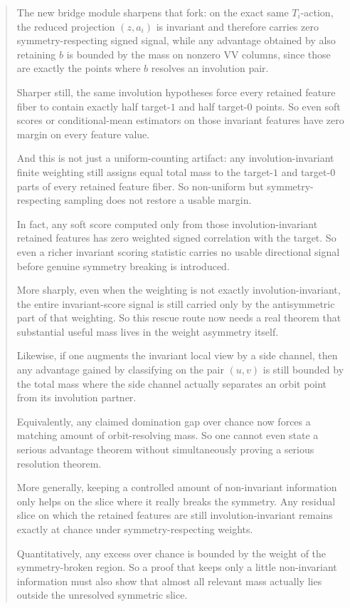 \documentclass[11pt]{article}
\theoremstyle{remark}
\begin{document}
\begin{abstract}
The new bridge module sharpens that fork: on the exact same \(T_i\)-action, the reduced projection
\((z,a_i)\) is invariant and therefore carries zero symmetry-respecting signed signal, while any
advantage obtained by also retaining \(b\) is bounded by the mass on nonzero VV columns, since
those are exactly the points where \(b\) resolves an involution pair.

Sharper still, the same involution hypotheses force every retained feature fiber to contain
exactly half target-\(1\) and half target-\(0\) points.  So even soft scores or conditional-mean
estimators on those invariant features have zero margin on every feature value.

And this is not just a uniform-counting artifact: any involution-invariant finite weighting still
assigns equal total mass to the target-\(1\) and target-\(0\) parts of every retained feature
fiber.  So non-uniform but symmetry-respecting sampling does not restore a usable margin.

In fact, any soft score computed only from those involution-invariant retained features has zero
weighted signed correlation with the target.  So even a richer invariant scoring statistic carries
no usable directional signal before genuine symmetry breaking is introduced.

More sharply, even when the weighting is not exactly involution-invariant, the entire invariant-score
signal is still carried only by the antisymmetric part of that weighting.  So this rescue route now
needs a real theorem that substantial useful mass lives in the weight asymmetry itself.

Likewise, if one augments the invariant local view by a side channel, then any advantage gained by
classifying on the pair \((u,v)\) is still bounded by the total mass where the side channel actually
separates an orbit point from its involution partner.

Equivalently, any claimed domination gap over chance now forces a matching amount of orbit-resolving
mass.  So one cannot even state a serious advantage theorem without simultaneously proving a serious
resolution theorem.

More generally, keeping a controlled amount of non-invariant information only helps on the slice
where it really breaks the symmetry.  Any residual slice on which the retained features are still
involution-invariant remains exactly at chance under symmetry-respecting weights.

Quantitatively, any excess over chance is bounded by the weight of the
symmetry-broken region.  So a proof that keeps only a little non-invariant information must also
show that almost all relevant mass actually lies outside the unresolved symmetric slice.


\end{abstract}
\end{document}
